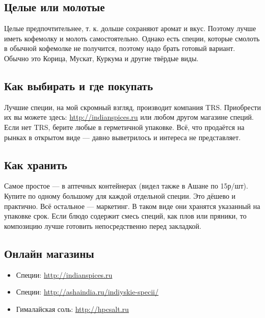 \subsection{Целые или молотые}
Целые предпочтительнее, т. к. дольше сохраняют аромат и вкус. Поэтому лучше иметь кофемолку и молоть самостоятельно. Однако есть специи, которые смолоть в обычной кофемолке не получится, поэтому надо брать готовый вариант. Обычно это Корица, Мускат, Куркума и другие твёрдые виды.

\subsection{Как выбирать и где покупать}
Лучшие специи, на мой скромный взгляд, производит компания TRS. Приобрести их вы можете здесь: \href{http://indianspices.ru}{\small http://indianspices.ru} или любом другом магазине специй. Если нет TRS,  %
берите любые в герметичной упаковке. Всё, что продаётся на рынках в открытом виде — давно выветрилось и интереса не представляет.

\subsection{Как хранить}
Самое простое — в аптечных контейнерах (видел также в Ашане по 15р/шт). Купите по одному большому для каждой отдельной специи. Это дёшево и практично. Всё остальное — маркетинг. В таком виде они хранятся указанный на упаковке срок.
Если блюдо содержит смесь специй, как плов или пряники, то композицию лучше готовить непосредственно перед закладкой.

\subsection{Онлайн магазины}
\begin{itemize}
\item Специи: \href{http://indianspices.ru}{\small http://indianspices.ru}
\item Специи: \href{http://ashaindia.ru/indiyskie-specii/}{\small http://ashaindia.ru/indiyskie-specii/}
\item Гималайская соль: \href{http://hpcsalt.ru}{\small http://hpcsalt.ru}
\end{itemize}

% 
% 

